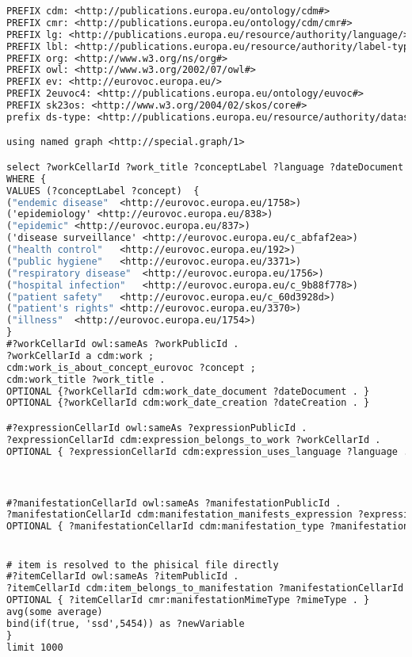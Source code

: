 \documentclass[11pt,a4paper,final,oneside,onecolumn]{article}
\begin{document}
	\begin{lstlisting}[language=SPARQL1.1]
PREFIX cdm: <http://publications.europa.eu/ontology/cdm#>
PREFIX cmr: <http://publications.europa.eu/ontology/cdm/cmr#>
PREFIX lg: <http://publications.europa.eu/resource/authority/language/>
PREFIX lbl: <http://publications.europa.eu/resource/authority/label-type/>
PREFIX org: <http://www.w3.org/ns/org#>
PREFIX owl: <http://www.w3.org/2002/07/owl#>
PREFIX ev: <http://eurovoc.europa.eu/>
PREFIX 2euvoc4: <http://publications.europa.eu/ontology/euvoc#>
PREFIX sk23os: <http://www.w3.org/2004/02/skos/core#>
prefix ds-type: <http://publications.europa.eu/resource/authority/dataset-type/>

using named graph <http://special.graph/1>

select ?workCellarId ?work_title ?conceptLabel ?language ?dateDocument ?dateCreation ?manifestationType ?mimeType (?itemCellarId as  ?download)
WHERE {    
VALUES (?conceptLabel ?concept)  {
("endemic disease"  <http://eurovoc.europa.eu/1758>)
('epidemiology' <http://eurovoc.europa.eu/838>)
("epidemic" <http://eurovoc.europa.eu/837>)
('disease surveillance' <http://eurovoc.europa.eu/c_abfaf2ea>)
("health control"   <http://eurovoc.europa.eu/192>)
("public hygiene"   <http://eurovoc.europa.eu/3371>)
("respiratory disease"  <http://eurovoc.europa.eu/1756>)
("hospital infection"   <http://eurovoc.europa.eu/c_9b88f778>)
("patient safety"   <http://eurovoc.europa.eu/c_60d3928d>)
("patient's rights" <http://eurovoc.europa.eu/3370>)
("illness"  <http://eurovoc.europa.eu/1754>)
}
#?workCellarId owl:sameAs ?workPublicId .
?workCellarId a cdm:work ;
cdm:work_is_about_concept_eurovoc ?concept ;
cdm:work_title ?work_title .
OPTIONAL {?workCellarId cdm:work_date_document ?dateDocument . }
OPTIONAL {?workCellarId cdm:work_date_creation ?dateCreation . }

#?expressionCellarId owl:sameAs ?expressionPublicId .
?expressionCellarId cdm:expression_belongs_to_work ?workCellarId .
OPTIONAL { ?expressionCellarId cdm:expression_uses_language ?language . }



#?manifestationCellarId owl:sameAs ?manifestationPublicId .
?manifestationCellarId cdm:manifestation_manifests_expression ?expressionCellarId .    
OPTIONAL { ?manifestationCellarId cdm:manifestation_type ?manifestationType . }


# item is resolved to the phisical file directly
#?itemCellarId owl:sameAs ?itemPublicId .
?itemCellarId cdm:item_belongs_to_manifestation ?manifestationCellarId .    
OPTIONAL { ?itemCellarId cmr:manifestationMimeType ?mimeType . }
avg(some average)
bind(if(true, 'ssd',5454)) as ?newVariable
}
limit 1000
	\end{lstlisting}
	
\end{document}
